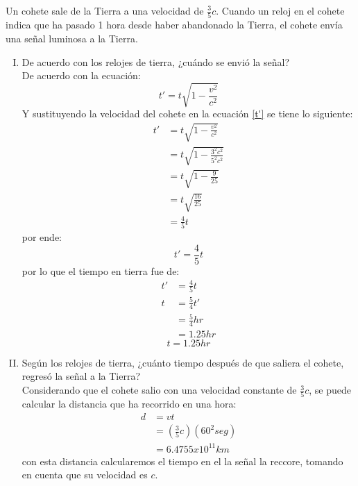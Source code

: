 \documentclass[12pt,letterpaper]{report}
\begin{document}
Un cohete sale de la Tierra a una velocidad de $\frac{3}{5}c$. Cuando un reloj en el cohete indica que ha pasado 1 hora desde haber abandonado la Tierra, el cohete envía una señal luminosa a la Tierra.
\begin{enumerate}[I)]
    \item De acuerdo con los relojes de tierra, ¿cuándo se envió la señal?\\
    De acuerdo con la ecuación:
    \begin{equation}
        \label{t'}
        {t}'=t\sqrt{1-\frac{v^2}{c^2}}
    \end{equation}
    Y sustituyendo la velocidad del cohete en la ecuación \ref{t'} se tiene lo siguiente:
    \begin{align*}
        {t}'&= t\sqrt{1-\frac{v^2}{c^2}}\\
            &= t\sqrt{1-\frac{3^2c^2}{5^2c^2}}\\
            &= t\sqrt{1-\frac{9}{25}}\\
            &= t\sqrt{\frac{16}{25}}\\
            &=\frac{4}{5}t
    \end{align*}
    por ende:
    \begin{equation}
        \label{t'resul}
        {t}'=\frac{4}{5}t
    \end{equation}
    por lo que el tiempo en tierra fue de:
    \begin{align*}
        {t}'&=\frac{4}{5}t\\
        t   &=\frac{5}{4}{t}'\\
            &=\frac{5}{4} hr\\
            & = 1.25 hr
    \end{align*}
    \begin{equation}
        \label{ttierra}
        t=1.25 hr
    \end{equation}
    \item Según los relojes de tierra, ¿cuánto tiempo después de que saliera el cohete, regresó la señal a la Tierra?\\
    Considerando que el cohete salio con una velocidad constante de $\frac{3}{5}c$, se puede calcular la distancia que ha recorrido en una hora:
    \begin{align*}
        d   &=vt\\
            &=\left(\frac{3}{5}c\right)\left(60^2 seg\right)\\
            &=6.4755x10^{11} km 
    \end{align*}
    con esta distancia calcularemos el tiempo en el la señal la reccore, tomando en cuenta que su velocidad es $c$.

\end{enumerate}
\end{document}
